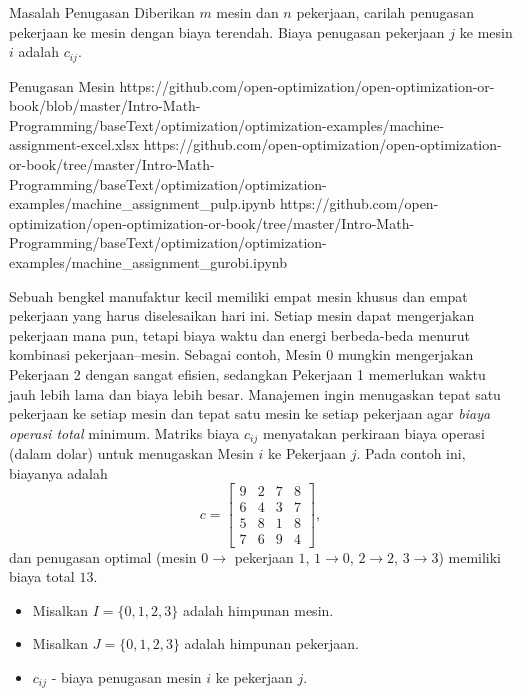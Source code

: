 \begin{general}{Masalah Penugasan}{}{}
Diberikan $m$ mesin dan $n$ pekerjaan, carilah penugasan pekerjaan ke mesin dengan biaya terendah. Biaya penugasan pekerjaan $j$ ke mesin $i$ adalah $c_{ij}$.
\end{general}
%

\begin{examplewithallcode}{Penugasan Mesin}
{https://github.com/open-optimization/open-optimization-or-book/blob/master/Intro-Math-Programming/baseText/optimization/optimization-examples/machine-assignment-excel.xlsx}
{https://github.com/open-optimization/open-optimization-or-book/tree/master/Intro-Math-Programming/baseText/optimization/optimization-examples/machine_assignment_pulp.ipynb}
{https://github.com/open-optimization/open-optimization-or-book/tree/master/Intro-Math-Programming/baseText/optimization/optimization-examples/machine_assignment_gurobi.ipynb}
\label{ex:machine-assignment}

Sebuah bengkel manufaktur kecil memiliki empat mesin khusus dan empat pekerjaan yang harus diselesaikan hari ini.  
Setiap mesin dapat mengerjakan pekerjaan mana pun, tetapi biaya waktu dan energi berbeda-beda menurut kombinasi pekerjaan–mesin.  
Sebagai contoh, Mesin 0 mungkin mengerjakan Pekerjaan 2 dengan sangat efisien, sedangkan Pekerjaan 1 memerlukan waktu jauh lebih lama dan biaya lebih besar.  
Manajemen ingin menugaskan tepat satu pekerjaan ke setiap mesin dan tepat satu mesin ke setiap pekerjaan agar \emph{biaya operasi total} minimum.  
Matriks biaya \(c_{ij}\) menyatakan perkiraan biaya operasi (dalam dolar) untuk menugaskan Mesin \(i\) ke Pekerjaan \(j\). Pada contoh ini, biayanya adalah
\[
c = \begin{bmatrix} 9 & 2 & 7 & 8 \\ 6 & 4 & 3 & 7 \\ 5 & 8 & 1 & 8 \\ 7 & 6 & 9 & 4 \end{bmatrix},
\]
dan penugasan optimal (mesin $0 \to$ pekerjaan $1$, $1 \to 0$, $2 \to 2$, $3 \to 3$) memiliki biaya total $13$.


\begin{itemize}
\item Misalkan $I = \{0,1,2,3\}$ adalah himpunan mesin.
\item Misalkan $J = \{0,1, 2,3\}$ adalah himpunan pekerjaan.
\end{itemize}

\begin{itemize}
\item $c_{ij}$ - biaya penugasan mesin $i$ ke pekerjaan $j$.
\end{itemize}


\end{examplewithallcode}
